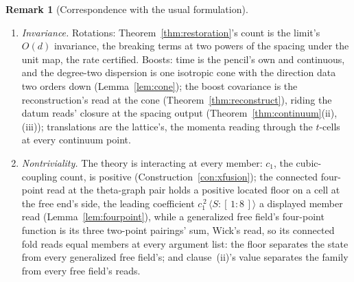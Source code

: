 \documentclass[11pt]{article}
\theoremstyle{definition}
\newtheorem{remark}{Remark}
\begin{document}
\begin{remark}[Correspondence with the usual formulation]
\begin{enumerate}[leftmargin=2em,itemsep=3pt]
\item \emph{Invariance.} Rotations: Theorem~\ref{thm:restoration}'s
count is the limit's $O(d)$ invariance, the breaking terms at
two powers of the spacing under the unit map, the rate certified.
Boosts: time is the pencil's own and continuous, and the
degree-two dispersion is one isotropic cone with the direction
data two orders down (Lemma~\ref{lem:cone}); the boost covariance
is the reconstruction's read at the cone
(Theorem~\ref{thm:reconstruct}), riding
the datum reads' closure at the spacing output
(Theorem~\ref{thm:continuum}(ii),(iii)); translations are the lattice's,
the momenta
reading through the $t$-cells at every continuum point.

\item \emph{Nontriviality.} The theory is interacting at every
member: $c_1$, the cubic-coupling count, is positive
(Construction~\ref{con:xfusion}); the connected four-point read
at the theta-graph pair holds a positive located floor on a cell
at the free end's side, the leading coefficient
$c_1^{\,2}\,\langle S\!:\![\,1:8\,]\rangle$ a displayed member
read (Lemma~\ref{lem:fourpoint}), while a generalized free
field's four-point function is its three two-point pairings'
sum, Wick's read, so its connected fold reads equal members at
every argument list: the
floor separates the state from every generalized free field's;
and clause~(ii)'s value separates
the family from every free field's reads.


\end{enumerate}
\end{remark}
\end{document}
